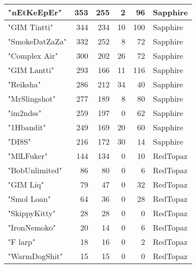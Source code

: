\documentclass{article}
\begin{document}
\begin{table}[htbp]
\begin{tabular}{|l|r|r|r|r|l|}
"nEtKeEpEr" & 353 & 255 & 2 & 96 & Sapphire \\ \hline
"GIM Tintti" & 344 & 234 & 10 & 100 & Sapphire \\ \hline
"SmokeDatZaZa" & 332 & 252 & 8 & 72 & Sapphire \\ \hline
"Complex Air" & 300 & 202 & 26 & 72 & Sapphire \\ \hline
"GIM Lantti" & 293 & 166 & 11 & 116 & Sapphire \\ \hline
"Reiksha" & 286 & 212 & 34 & 40 & Sapphire \\ \hline
"MrSlingshot" & 277 & 189 & 8 & 80 & Sapphire \\ \hline
"im2ndss" & 259 & 197 & 0 & 62 & Sapphire \\ \hline
"1Hbandit" & 249 & 169 & 20 & 60 & Sapphire \\ \hline
"DI8S" & 216 & 172 & 30 & 14 & Sapphire \\ \hline
"MlLFuker" & 144 & 134 & 0 & 10 & RedTopaz \\ \hline
"BobUnlimited" & 86 & 80 & 0 & 6 & RedTopaz \\ \hline
"GIM Liq" & 79 & 47 & 0 & 32 & RedTopaz \\ \hline
"Smol Loan" & 64 & 36 & 0 & 28 & RedTopaz \\ \hline
"SkippyKitty" & 28 & 28 & 0 & 0 & RedTopaz \\ \hline
"IronNemoko" & 20 & 14 & 0 & 6 & RedTopaz \\ \hline
"F larp" & 18 & 16 & 0 & 2 & RedTopaz \\ \hline
"WarmDogShit" & 15 & 15 & 0 & 0 & RedTopaz \\ \hline
\end{tabular}
\end{table}
\end{document}
